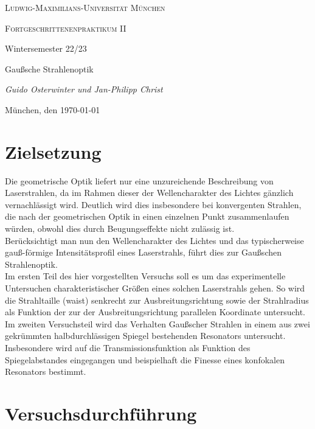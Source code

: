 \documentclass[11pt,a4paper,oneside]{scrartcl}
\begin{document}
\begin{titlepage}
	\centering
	{\scshape\LARGE Ludwig-Maximilians-Universität \linebreak München \par}
	\vspace{1cm}
	{\scshape\Large Fortgeschrittenenpraktikum II \par Wintersemester 22/23 \par}
	\vspace{1.5cm}
	{\huge\bfseries \par  Gaußsche Strahlenoptik\par}
	\vspace{2cm}
	{\Large\itshape Guido Osterwinter und Jan-Philipp Christ \par}
	\vfill
	{\large München, den \today\par}
\end{titlepage}

\tableofcontents
\newpage
\section{Zielsetzung}
Die geometrische Optik liefert nur eine unzureichende Beschreibung von Laserstrahlen, da im Rahmen dieser der Wellencharakter des Lichtes gänzlich vernachlässigt wird. Deutlich wird dies insbesondere bei konvergenten Strahlen, die nach der geometrischen Optik in einen einzelnen Punkt zusammenlaufen würden, obwohl dies durch Beugungseffekte nicht zulässig ist. \\
Berücksichtigt man nun den Wellencharakter des Lichtes und das typischerweise gauß-förmige Intensitätsprofil eines Laserstrahls, führt dies zur Gaußschen Strahlenoptik. \\
Im ersten Teil des hier vorgestellten Versuchs soll es um das experimentelle Untersuchen charakteristischer Größen eines solchen Laserstrahls gehen. So wird die Strahltaille (waist) senkrecht zur Ausbreitungsrichtung sowie der Strahlradius als Funktion der zur der Ausbreitungsrichtung parallelen Koordinate untersucht.\\
Im zweiten Versuchsteil wird das Verhalten Gaußscher Strahlen in einem aus zwei gekrümmten halbdurchlässigen Spiegel bestehenden Resonators untersucht. Insbesondere wird auf die Transmissionsfunktion als Funktion des Spiegelabstandes eingegangen und beispielhaft die Finesse eines konfokalen Resonators bestimmt. 
\section{Versuchsdurchführung}
\end{document}

